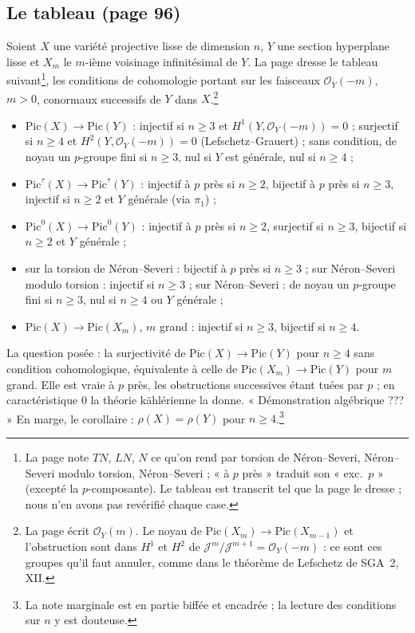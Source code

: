 \documentclass[11pt,a4paper]{article}
\begin{document}
\subsection*{Le tableau (page 96)}

Soient $X$ une variété projective lisse de dimension $n$, $Y$ une section
hyperplane lisse et $X_m$ le $m$-ième voisinage infinitésimal de $Y$. La page
dresse le tableau suivant\footnote{La page note $TN$, $LN$, $N$ ce qu'on rend par torsion de
Néron--Severi, Néron--Severi modulo torsion, Néron--Severi ; « à $p$ près »
traduit son « exc.\ $p$ » (excepté la $p$-composante). Le tableau est
transcrit tel que la page le dresse ; nous n'en avons pas revérifié chaque
case.}, les conditions de cohomologie portant sur les
faisceaux $\mathcal{O}_Y(-m)$, $m > 0$, conormaux successifs de $Y$ dans
$X$.\footnote{La page écrit $\mathcal{O}_Y(m)$. Le noyau de
$\mathrm{Pic}(X_{m}) \to \mathrm{Pic}(X_{m-1})$ et l'obstruction sont dans
$H^1$ et $H^2$ de $\mathcal{J}^m/\mathcal{J}^{m+1} = \mathcal{O}_Y(-m)$ : ce
sont ces groupes qu'il faut annuler, comme dans le théorème de Lefschetz de
SGA~2, XII.}
\begin{itemize}
  \item $\mathrm{Pic}(X) \to \mathrm{Pic}(Y)$ : injectif si $n \geq 3$ et
    $H^1(Y, \mathcal{O}_Y(-m)) = 0$ ; surjectif si $n \geq 4$ et
    $H^2(Y, \mathcal{O}_Y(-m)) = 0$ (Lefschetz--Grauert) ; sans condition, de
    noyau un $p$-groupe fini si $n \geq 3$, nul si $Y$ est générale, nul si
    $n \geq 4$ ;
  \item $\mathrm{Pic}^\tau(X) \to \mathrm{Pic}^\tau(Y)$ : injectif à $p$ près
    si $n \geq 2$, bijectif à $p$ près si $n \geq 3$, injectif si $n \geq 2$
    et $Y$ générale (via $\pi_1$) ;
  \item $\mathrm{Pic}^0(X) \to \mathrm{Pic}^0(Y)$ : injectif à $p$ près si
    $n \geq 2$, surjectif si $n \geq 3$, bijectif si $n \geq 2$ et $Y$
    générale ;
  \item sur la torsion de Néron--Severi : bijectif à $p$ près si $n \geq 3$ ;
    sur Néron--Severi modulo torsion : injectif si $n \geq 3$ ; sur
    Néron--Severi : de noyau un $p$-groupe fini si $n \geq 3$, nul si
    $n \geq 4$ ou $Y$ générale ;
  \item $\mathrm{Pic}(X) \to \mathrm{Pic}(X_m)$, $m$ grand : injectif si
    $n \geq 3$, bijectif si $n \geq 4$.
\end{itemize}

La question posée : la surjectivité de $\mathrm{Pic}(X) \to \mathrm{Pic}(Y)$
pour $n \geq 4$ sans condition cohomologique, équivalente à celle de
$\mathrm{Pic}(X_m) \to \mathrm{Pic}(Y)$ pour $m$ grand. Elle est vraie à $p$
près, les obstructions successives étant tuées par $p$ ; en caractéristique
$0$ la théorie kählérienne la donne. « Démonstration algébrique ??? » En marge,
le corollaire : $\rho(X) = \rho(Y)$ pour $n \geq 4$.\footnote{La note marginale
est en partie biffée et encadrée ; la lecture des conditions sur $n$ y est
douteuse.}
\end{document}

